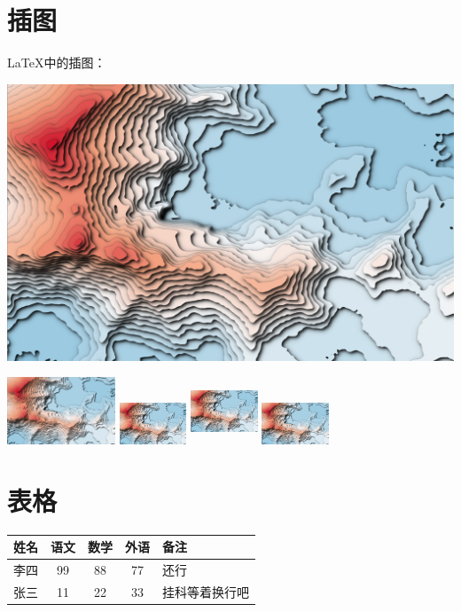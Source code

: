 \documentclass{ctexart}
\begin{document}
	\section{插图}
	\LaTeX{}中的插图：
	
	\includegraphics[scale=0.1]{test.png}
	
	\includegraphics[height=2cm]{test.png}
	\includegraphics[width=2cm]{test.png}
	\includegraphics[width=2cm,height=2cm]{test.png}
	\includegraphics[angle=-45,width=2cm]{test.png}
	\section{表格}
	\begin{tabular}{l||c c c|p{1.5cm}}
		\hline \hline
		姓名 & 语文 & 数学 & 外语 & 备注 \\
		\hline
		李四 & 99 & 88 & 77 & 还行 \\
		张三 & 11 & 22 & 33 & 挂科等着换行吧 \\
		\hline
	\end{tabular}
\end{document}
